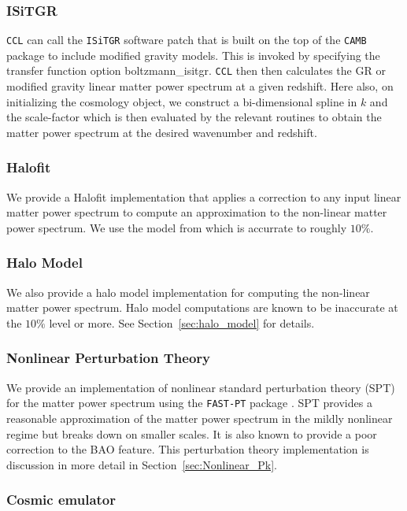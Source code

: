 \documentclass[\docopts]{\docclass}
\newcommand{\ccl}{{\tt CCL}\xspace}
\begin{document}
\newpage

\subsubsection{ISiTGR}
\ccl can call the {\tt ISiTGR} software patch \citep{isitgr1,isitgr2} that is
built on the top of the {\tt CAMB} package to include modified gravity models.
This is invoked by specifying the transfer function option boltzmann\_isitgr.
\ccl then then calculates the GR or modified gravity linear matter power spectrum
at a given redshift. Here also, on initializing the cosmology object, we construct a
bi-dimensional spline in $k$ and the scale-factor which is then evaluated by the
relevant routines to obtain the matter power spectrum at the desired wavenumber
and redshift.

\subsubsection{Halofit}
We provide a Halofit implementation that applies a correction to any input
linear matter power spectrum to compute an approximation to the non-linear
matter power spectrum. We use the model from \citet{CLASS_halofit} which is
accurrate to roughly $10\%$.

\subsubsection{Halo Model}
We also provide a halo model implementation for computing the non-linear matter
power spectrum. Halo model computations are known to be inaccurate at the $10\%$
level or more. See Section~\ref{sec:halo_model} for details.

\subsubsection{Nonlinear Perturbation Theory}
We provide an implementation of nonlinear standard perturbation theory (SPT) for the matter power spectrum
using the {\tt FAST-PT} package \citep{mcewen16}. SPT provides a reasonable approximation of the matter
power spectrum in the mildly nonlinear regime but breaks down on smaller scales.
It is also known to provide a poor correction to the BAO feature.
This perturbation theory implementation is discussion in more detail in Section~\ref{sec:Nonlinear_Pk}.

\subsubsection{Cosmic emulator}
\end{document}

